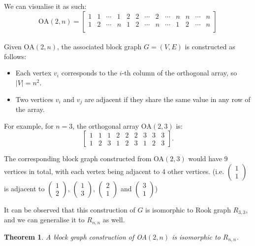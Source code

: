 \documentclass{article}
\newtheorem{theorem}{Theorem}
\begin{document}
We can visualise it as such:
$$
\text{OA}(2, n) = \begin{bmatrix}
    1 & 1 & \cdots & 1 & 2 & 2 & \cdots & 2 & \cdots & n & n & \cdots & n \\
    1 & 2 & \cdots & n & 1 & 2 & \cdots & n & \cdots & 1 & 2 & \cdots & n \\
\end{bmatrix}
$$
\\
Given \( \text{OA}(2, n) \), the associated block graph \( G = (V, E) \) is constructed as follows:
\begin{itemize}
    \item Each vertex \( v_i \) corresponds to the \( i \)-th column of the orthogonal array, so \( |V| = n^2 \).
    \item Two vertices \( v_i \) and \( v_j \) are adjacent if they share the same value in any row of the array.
\end{itemize}

For example, for \( n = 3 \), the orthogonal array \( \text{OA}(2, 3) \) is:
\[
\begin{bmatrix}
1 & 1 & 1 & 2 & 2 & 2 & 3 & 3 & 3 \\
1 & 2 & 3 & 1 & 2 & 3 & 1 & 2 & 3
\end{bmatrix}.
\]

The corresponding block graph constructed from OA\((2, 3)\) would have $9$ vertices in total, with each vertex being adjacent to 4 other vertices.
(i.e. $\begin{pmatrix}
    1\\1
\end{pmatrix}$ is adjacent to $\begin{pmatrix}
    1\\2
\end{pmatrix}$, $\begin{pmatrix}
    1\\3
\end{pmatrix}$, $\begin{pmatrix}
    2\\1
\end{pmatrix}$ and $\begin{pmatrix}
    3\\1
\end{pmatrix}$)

It can be observed that this construction of \(G\) is isomorphic to Rook graph \(R_{3,3}\), and we can generalise it to \(R_{n,n}\) as well.

\begin{theorem}
    A block graph construction of OA\((2,n)\) is isomorphic to \(R_{n,n}\).
\end{theorem}
\end{document}
